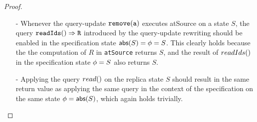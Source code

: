 \begin {proof}
\begin{itemize}
\begin{itemize}
    Let us prove $S' = \abstate'$ by contradiction.

        \begin{itemize}
        \setlength{\itemsep}{0.5pt}
        \item[-] If there exists item $(c,V'')$ in $\abstate'$ but not in $S'$: we can see that $(c,V'') \in S$, $(c,V'') \notin S_1$, and $(c,V'') \in S_2$.

        Let $\alabel_c$ be the operation that generates effector $(c,V'')$. Since $(c,V'') \notin S_1$, we know that there exists a {\tt write} operation $\alabel_1$, such that $(\alabel_c,\alabel_1)$, $(\alabel_1,\alabel) \in \avisord$. Since $(c,V'') \in S$, we can see that the effector of $\alabel_1$ has not been applied yet in the replica of $S$, and also the effector of $\alabel_1$ has not been applied yet in the replica of $S'$, while in $S'$, the downstream of $\alabel$ has been applied. Since $(\alabel_1,\alabel) \in \avisord$, we can see that this violates the causal delivery assumption.

        \item[-] If there exists item $(c,V'')$ in $S'$ but not in $\abstate'$: we can see that $(c,V'') \in S$, $(c,V'') \notin S_2$, and $(c,V'') \in S_1$.

        Let $\alabel_c$ be the operation that generates effector $(c,V'')$. Since $(c,V'') \notin S_2$, we know that $\neg(V'' < V')$. Since $(c,V'') \in S_1$, we know that $(\alabel_c,\alabel) \in \avisord$. This contradicts $fact1$ and $fact2$.
        \end{itemize}

    Therefore, we know that $S' = \abstate'$, and the case of the effector $(a,V')$ and the $\alabelshort[{\tt write}]{a,V',S_1}$ operation of the specification $\specMVReg$ holds.

    \item[-] Whenever the query-update $\alabelshort[{\tt remove}]{a}$ executes atSource on a state $S$, the query $\alabellong[{\tt readIds}]{}{R}{}$ introduced by the query-update rewriting should be enabled in the specification state $\refmap(S)=\abstate=S$. This clearly holds because the the computation of $R$ in {\tt atSource} returns $S$, and the result of $\alabelshort[readIds]{}$ in the specification state $\abstate = S$ also returns $S$.

    \item[-] Applying the query $\alabelshort[read]{}$ on the replica state $S$ should result in the same return value as applying the same query in the context of the specification on the same state $\abstate = \refmap(S)$, which again holds trivially.
    \end{itemize}


\end{itemize}
\end{proof}
